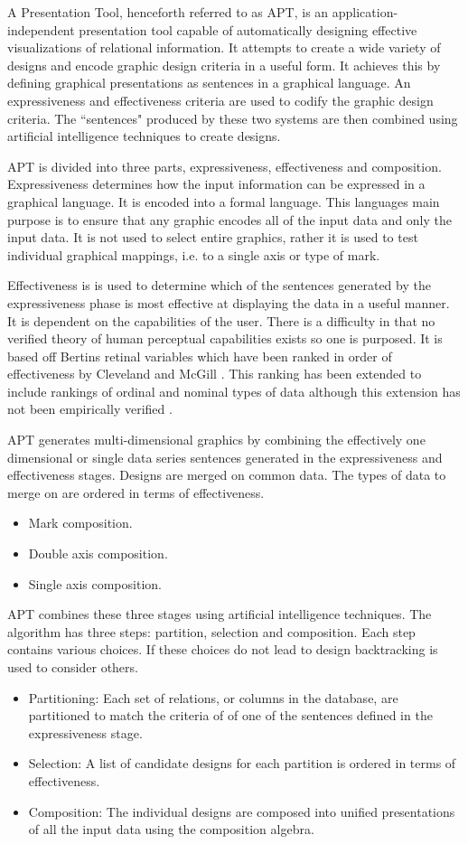 \documentclass[a4paper, 11pt, titlepage, onehalfspacing]{report}
\begin{document}
A Presentation Tool, henceforth referred to as APT, is an application-independent presentation tool capable of automatically designing effective visualizations of relational information. It attempts to create a wide variety of designs and encode graphic design criteria in a useful form. It achieves this by defining graphical presentations as sentences in a graphical language. An expressiveness and effectiveness criteria are used to codify the graphic design criteria. The ``sentences" produced by these two systems are then combined using artificial intelligence techniques to create designs.

APT is divided into three parts, expressiveness, effectiveness and composition. Expressiveness determines how the input information can be expressed in a graphical language. It is encoded into a formal language. This languages main purpose is to ensure that any graphic encodes all of the input data and only the input data. It is not used to select entire graphics, rather it is used to test individual graphical mappings, i.e. to a single axis or type of mark.

Effectiveness is is used to determine which of the sentences generated by the expressiveness phase is most effective at displaying the data in a useful manner. It is dependent on the capabilities of the user. There is a difficulty in that no verified theory of human perceptual capabilities exists so one is purposed. It is based off Bertins retinal variables \cite{bertin1973semiologie} which have been ranked in order of effectiveness by Cleveland and McGill \cite{cleveland1984graphical}. This ranking has been extended to include rankings of ordinal and nominal types of data although this extension has not been empirically verified \cite{card1999readings}.

APT generates multi-dimensional graphics by combining the effectively one dimensional or single data series sentences generated in the expressiveness and effectiveness stages. Designs are merged on common data. The types of data to merge on are ordered in terms of effectiveness.
\begin{itemize}
\item Mark composition.
\item Double axis composition.
\item Single axis composition.
\end{itemize}
APT combines these three stages using artificial intelligence techniques. The algorithm has three steps: partition, selection and composition. Each step contains various choices. If these choices do not lead to design backtracking is used to consider others.
\begin{itemize}
\item Partitioning: Each set of relations, or columns in the database, are partitioned to match the criteria of of one of the sentences defined in the expressiveness stage.
\item Selection: A list of candidate designs for each partition is ordered in terms of effectiveness. 
\item Composition: The individual designs are composed into unified presentations of all the input data using the composition algebra.
\end{itemize}
\end{document}
